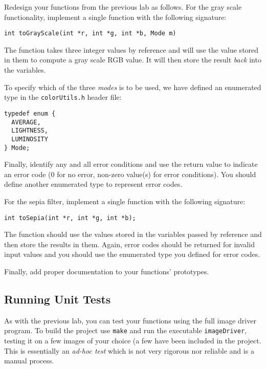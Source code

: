 \documentclass[12pt]{scrartcl}
\begin{document}
Redesign your functions from the previous lab as follows.  For 
the gray scale functionality, implement a single function with
the following signature:

\texttt{int toGrayScale(int *r, int *g, int *b, Mode m)}

The function takes three integer values by reference and will 
use the value stored in them to compute a gray scale RGB value.
It will then store the result \emph{back} into the variables.

To specify which of the three \emph{modes} is to be used, we have
defined an enumerated type in the \texttt{colorUtils.h}
header file:
\begin{verbatim}
typedef enum {
  AVERAGE,
  LIGHTNESS,
  LUMINOSITY
} Mode;
\end{verbatim}
Finally, identify any and all error conditions and use the return 
value to indicate an error code (0 for no error, non-zero value(s) 
for error conditions).  You should define another enumerated type
to represent error codes.

For the sepia filter, implement a single function with the following
signature:

\texttt{int toSepia(int *r, int *g, int *b);}

The function should use the values stored in the variables passed
by reference and then store the results in them.  Again, error codes
should be returned for invalid input values and you should use the
enumerated type you defined for error codes.

Finally, add proper documentation to your functions' prototypes.

\subsection{Running Unit Tests}

%
%
As with the previous lab, you can test your functions using the full image driver
program.  To build the project use \texttt{make} and
run the executable \texttt{imageDriver}, testing it on
a few images of your choice (a few have been included in the
project.  This is essentially an 
\emph{ad-hoc test} which is not very rigorous nor reliable 
and is a manual process.  
\end{document}
